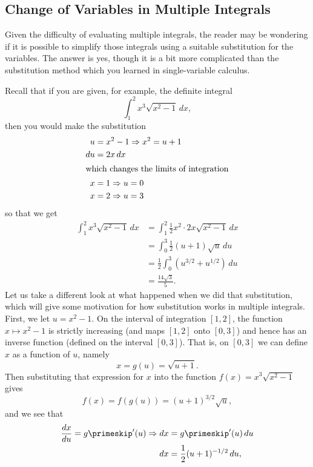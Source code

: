 
\subsection{Change of Variables in Multiple Integrals}

Given the difficulty of evaluating multiple integrals, the reader may be wondering if it is possible to simplify those integrals using a suitable substitution for the variables. The answer is yes, though it is a bit more complicated than the substitution method which you learned in single-variable calculus.

Recall that if you are given, for example, the definite integral
\[\int_1^2 x^3 \sqrt{x^2 - 1}\,dx ,\]
then you would make the substitution
\begin{align*}
u &= x^2 - 1 \Rightarrow x^2 = u + 1\\
du &= 2x\,dx\\
\intertext{which changes the limits of integration}
x &= 1 \Rightarrow u = 0\\
x &= 2 \Rightarrow u = 3
\end{align*}
so that we get
\begin{align*}
 \int_1^2 x^3 \sqrt{x^2 - 1}\,dx &= \int_1^2 \frac12 x^2 \cdot 2x \sqrt{x^2 - 1}\,dx\\
 &= \int_0^3 \frac12 (u+1)\sqrt{u}\,du\\
 &= \frac12 \int_0^3 \left( u^{3/2} + u^{1/2} \right)\,du \\
 &= \frac{14\sqrt3}5 .
\end{align*}
Let us take a different look at what happened when we did that substitution, which will give some motivation for how substitution works in multiple integrals. First, we let $u = x^2 - 1$. On the interval of integration $[ 1,2 ]$, the function $x \mapsto x^2 - 1$ is strictly increasing (and maps $[ 1,2 ]$ onto $[ 0,3 ]$) and hence has an inverse function (defined on the interval $[ 0,3 ]$). That is, on $[ 0,3 ]$ we can define $x$ as a function of $u$, namely
\[x = g(u) = \sqrt{u+1} .\]
Then substituting that expression for $x$ into the function $f(x) = x^3 \sqrt{x^2 - 1}$ gives
\[f(x) = f(g(u)) = (u+1)^{3/2} \sqrt{u} ,\]
and we see that
\begin{align*}
 \frac{dx}{du} = g\primeskip'(u) \Rightarrow dx &= g\primeskip'(u)\,du\\
 dx &= \frac12 (u+1)^{-1/2}\,du ,
\end{align*}
